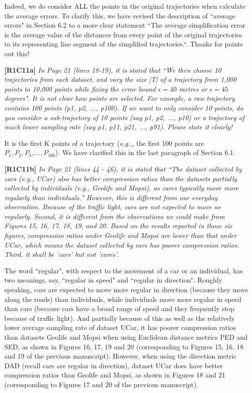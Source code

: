 \documentclass{letter}
\newcommand{\eg}{\emph{e.g.,}\xspace}
\begin{document}
{Indeed, we do consider ALL the points in the original trajectories when calculate the average errors. To clarify this, we have revised the description of ``average errors" in Section 6.2 to a more clear statement ``{The average simplification error is the average value of the distances from every point of the original trajectories to its representing line segment of the simplified trajectories.}``. Thanks for points out this!


\textbf{[R1C11a]} \emph{ In Page 21 (lines 18-19), it is stated that ``We then choose 10 trajectories from each dataset, and vary the size |T| of a trajectory from 1,000 points to 10,000 points while fixing the error bound $\epsilon = 40$ metres or $\epsilon = 45$ degrees". It is not clear how points are selected. For example, a raw trajectory contains 100 points (p1, p2, ..., p100). If we want to only consider 10 points, do you consider a sub-trajectory of 10 points (say p1, p2, ..., p10) or a trajectory of much lower sampling rate (say p1, p11, p21, ..., p91). Please state it clearly!}

It is the first K points of a trajectory (\eg, the first 100 points are $P_1, P_2, P_3, ..., P_{100}$). We have clarified this in the last paragraph of Section 6.1.

\textbf{[R1C11b]} \emph{ In Page 21 (lines 44 - 46), it is stated that ``The dataset collected by cars (e.g., UCar) also has better compression ratios than the datasets partially collected by individuals (e.g., Geolife and Mopsi), as cares typically move more regularly than individuals." However, this is different from our everyday observation. Because of the traffic light, cars are not expected to move so regularly. Second, it is different from the observations we could make from Figures 15, 16, 17, 18, 19, and 20. Based on the results reported in those six figures, compression ratios under Geolife and Mopsi are lower than that under UCar, which means the dataset collected by cars has poorer compression ratios. Third, it shall be 'cars' but not 'cares'. }

The word ``regular", with respect to the movement of a car or an individual, has two meanings, say, ``regular in speed" and ``regular in direction". Roughly speaking, cars are expected to move more regular in direction (because they move along the roads) than individuals, while individuals move more regular in speed than cars (because cars have a broad range of speed and they frequently stop because of traffic light).
And partially because of this as well as the relatively lower average sampling rate of dataset UCar, it has poorer compression ratios than datasets Geolife and Mopsi when using Euclidean distance metrics PED and SED, as shown in Figures 16, 17, 19 and 20 (corresponding to Figures 15, 16, 18 and 19 of the previous manuscript). However, when using the direction metric DAD (recall cars are regular in direction), dataset UCar does have better compression ratios than Geolife and Mopsi, as shown in Figures 18 and 21 (corresponding to Figures 17 and 20 of the previous manuscript).

}
\end{document}
